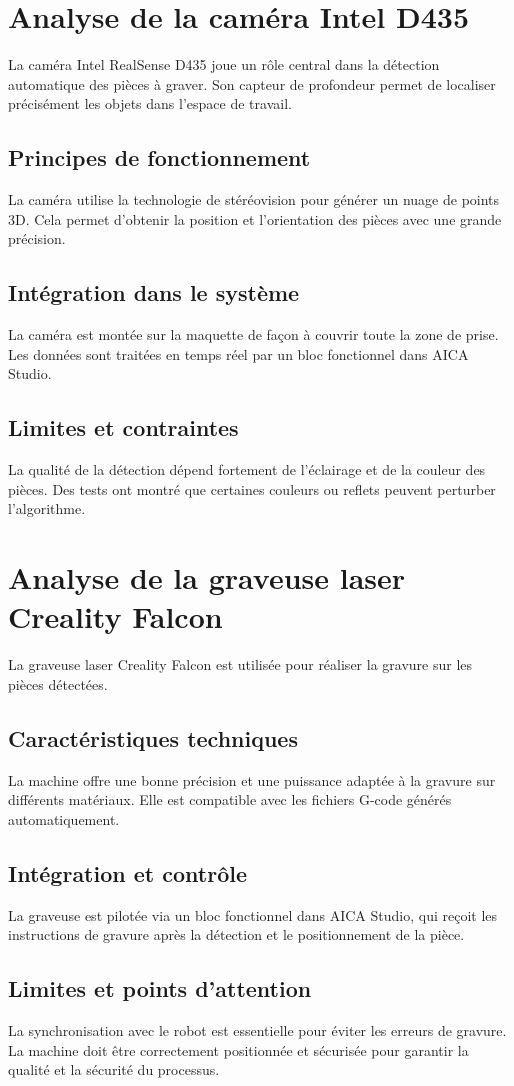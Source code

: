 \section{Analyse de la caméra Intel D435}
La caméra Intel RealSense D435 joue un rôle central dans la détection automatique des pièces à graver. Son capteur de profondeur permet de localiser précisément les objets dans l’espace de travail.
\subsection{Principes de fonctionnement}
La caméra utilise la technologie de stéréovision pour générer un nuage de points 3D. Cela permet d’obtenir la position et l’orientation des pièces avec une grande précision.
\subsection{Intégration dans le système}
La caméra est montée sur la maquette de façon à couvrir toute la zone de prise. Les données sont traitées en temps réel par un bloc fonctionnel dans AICA Studio.
\subsection{Limites et contraintes}
La qualité de la détection dépend fortement de l’éclairage et de la couleur des pièces. Des tests ont montré que certaines couleurs ou reflets peuvent perturber l’algorithme.

\section{Analyse de la graveuse laser Creality Falcon}
La graveuse laser Creality Falcon est utilisée pour réaliser la gravure sur les pièces détectées.
\subsection{Caractéristiques techniques}
La machine offre une bonne précision et une puissance adaptée à la gravure sur différents matériaux. Elle est compatible avec les fichiers G-code générés automatiquement.
\subsection{Intégration et contrôle}
La graveuse est pilotée via un bloc fonctionnel dans AICA Studio, qui reçoit les instructions de gravure après la détection et le positionnement de la pièce.
\subsection{Limites et points d’attention}
La synchronisation avec le robot est essentielle pour éviter les erreurs de gravure. La machine doit être correctement positionnée et sécurisée pour garantir la qualité et la sécurité du processus.

